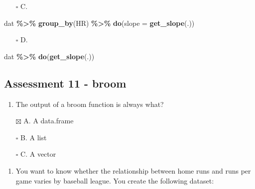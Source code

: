 \documentclass[
]{article}
\newenvironment{Shaded}{\begin{snugshade}}{\end{snugshade}}
\newcommand{\DataTypeTok}[1]{\textcolor[rgb]{0.13,0.29,0.53}{#1}}
\newcommand{\KeywordTok}[1]{\textcolor[rgb]{0.13,0.29,0.53}{\textbf{#1}}}
\newcommand{\NormalTok}[1]{#1}
\newcommand{\OperatorTok}[1]{\textcolor[rgb]{0.81,0.36,0.00}{\textbf{#1}}}
\newcommand{\StringTok}[1]{\textcolor[rgb]{0.31,0.60,0.02}{#1}}
\providecommand{\tightlist}{%
  \setlength{\itemsep}{0pt}\setlength{\parskip}{0pt}}
\begin{document}
\begin{itemize}
\tightlist
\item[$\square$]
  C.
\end{itemize}

\begin{Shaded}
\begin{Highlighting}[]
\NormalTok{dat }\OperatorTok{\%\textgreater{}\%}\StringTok{ }
\StringTok{  }\KeywordTok{group\_by}\NormalTok{(HR) }\OperatorTok{\%\textgreater{}\%}\StringTok{ }
\StringTok{  }\KeywordTok{do}\NormalTok{(}\DataTypeTok{slope =} \KeywordTok{get\_slope}\NormalTok{(.))}
\end{Highlighting}
\end{Shaded}

\begin{itemize}
\tightlist
\item[$\square$]
  D.
\end{itemize}

\begin{Shaded}
\begin{Highlighting}[]
\NormalTok{dat }\OperatorTok{\%\textgreater{}\%}\StringTok{ }
\StringTok{  }\KeywordTok{do}\NormalTok{(}\KeywordTok{get\_slope}\NormalTok{(.))}
\end{Highlighting}
\end{Shaded}

\hypertarget{assessment-11---broom}{%
\subsection{Assessment 11 - broom}\label{assessment-11---broom}}

\begin{enumerate}
\def\labelenumi{\arabic{enumi}.}
\tightlist
\item
  The output of a broom function is always what?
\end{enumerate}

\begin{itemize}
\tightlist
\item[$\boxtimes$]
  A. A data.frame
\item[$\square$]
  B. A list
\item[$\square$]
  C. A vector
\end{itemize}

\begin{enumerate}
\def\labelenumi{\arabic{enumi}.}
\setcounter{enumi}{1}
\tightlist
\item
  You want to know whether the relationship between home runs and runs
  per game varies by baseball league. You create the following dataset:
\end{enumerate}
\end{document}
